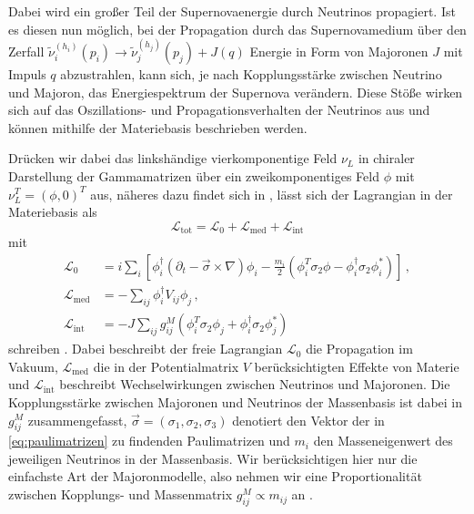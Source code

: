 Dabei wird ein großer Teil der Supernovaenergie durch Neutrinos propagiert.
Ist es diesen nun möglich, bei der Propagation durch das Supernovamedium über den Zerfall $\tilde{\nu}^{(h_i)}_i (p_i) \rightarrow \tilde{\nu}^{(h_j)}_j (p_j) + J(q)$
Energie in Form von Majoronen $J$ mit Impuls $q$ abzustrahlen, kann sich, je nach Kopplungsstärke zwischen Neutrino und Majoron, das Energiespektrum der Supernova verändern.
Diese Stöße wirken sich auf das Oszillations- und Propagationsverhalten der Neutrinos aus und können mithilfe der Materiebasis beschrieben werden.

Drücken wir dabei das linkshändige vierkomponentige Feld $\nu_L$ in chiraler Darstellung der Gammamatrizen über ein zweikomponentiges Feld $\phi$ mit $\nu^T_L = (\phi, 0)^T$ aus, 
näheres dazu findet sich in \cite{komponentendinger}, lässt sich der Lagrangian in der Materiebasis als
\begin{equation}
    \mathcal{L}_\text{tot} = \mathcal{L}_0 + \mathcal{L}_\text{med} + \mathcal{L}_\text{int}
    \label{eq:materielagrange}
\end{equation}
mit
\begin{align*}
    \mathcal{L}_0          &=   i \sum_i \left[\phi^\dagger_i \left(\partial_t - \vec{\sigma} \times \nabla \right) \phi_i - \frac{m_i}{2} \left(\phi^T_i \sigma_2 \phi - \phi^\dagger_i \sigma_2 \phi^*_i\right) \right] \,,\\
    \mathcal{L}_\text{med} &= - \sum_{i j} \phi^\dagger_i V_{i j} \phi_j  \,,\\
    \mathcal{L}_\text{int} &= - J \sum_{i j} g^M_{i j} \left( \phi^T_i \sigma_2 \phi_j + \phi^\dagger_i \sigma_2 \phi^*_j \right)
\end{align*}
schreiben \cite{päspaper}.
Dabei beschreibt der freie Lagrangian $\mathcal{L}_0$ die Propagation im Vakuum, $\mathcal{L}_\text{med}$ die in der Potentialmatrix $V$ berücksichtigten Effekte von Materie und $\mathcal{L}_\text{int}$
beschreibt Wechselwirkungen zwischen Neutrinos und Majoronen.
Die Kopplungsstärke zwischen Majoronen und Neutrinos der Massenbasis ist dabei in $g^M_{i j}$ zusammengefasst, $\vec{\sigma} = (\sigma_1, \sigma_2, \sigma_3)$ denotiert den Vektor der in \eqref{eq:paulimatrizen} zu findenden Paulimatrizen
und $m_i$ den Masseneigenwert des jeweiligen Neutrinos in der Massenbasis.
Wir berücksichtigen hier nur die einfachste Art der Majoronmodelle, also nehmen wir eine Proportionalität zwischen Kopplungs- und Massenmatrix $g^M_{i j} \propto m_{i j}$ an \cite{päspaper}.

